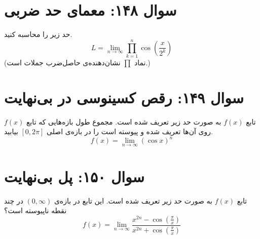 \documentclass[12pt]{article}
\begin{document}
\vspace{1cm}
\hrulefill
\vspace{1cm}

\section*{سوال ۱۴۸: معمای حد ضربی}
حد زیر را محاسبه کنید.
\begin{displaymath}
	L = \lim_{n \to \infty} \prod_{k=1}^{n} \cos\left(\frac{x}{2^k}\right)
\end{displaymath}
(نماد \( \prod \) نشان‌دهنده‌ی حاصل‌ضرب جملات است.)

\vspace{1cm}
\hrulefill
\vspace{1cm}

\section*{سوال ۱۴۹: رقص کسینوسی در بی‌نهایت}
تابع \(f(x)\) به صورت حد زیر تعریف شده است. مجموع طول بازه‌هایی که تابع \(f(x)\) روی آن‌ها تعریف شده و پیوسته است را در بازه‌ی اصلی \( [0, 2\pi] \) بیابید.
\begin{displaymath}
	f(x) = \lim_{n \to \infty} (\cos x)^n
\end{displaymath}

\vspace{1cm}
\hrulefill
\vspace{1cm}

\section*{سوال ۱۵۰: پل بی‌نهایت}
تابع \(f(x)\) به صورت حد زیر تعریف شده است. این تابع در بازه‌ی \( (0, \infty) \) در چند نقطه ناپیوسته است؟
\begin{displaymath}
	f(x) = \lim_{n \to \infty} \frac{x^{2n} - \cos(\frac{\pi}{x})}{x^{2n} + \cos(\frac{\pi}{x})}
\end{displaymath}
\end{document}
